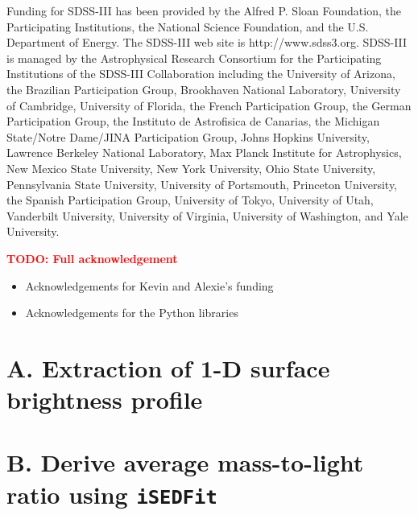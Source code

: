 \documentclass[preprint]{aastex}
\newcommand{\todo}[1]{\textcolor{red}{\textbf{TODO: #1}}}
\begin{document}
\begin{CJK*}{UTF8}{gbsn}
  Funding for SDSS-III has been provided by the Alfred P. Sloan Foundation, the
  Participating Institutions, the National Science Foundation, and the U.S.
  Department of Energy. The SDSS-III web site is http://www.sdss3.org.  SDSS-III
  is managed by the Astrophysical Research Consortium for the Participating
  Institutions of the SDSS-III Collaboration including the University of
  Arizona, the Brazilian Participation Group, Brookhaven National Laboratory,
  University of Cambridge, University of Florida, the French Participation
  Group, the German Participation Group, the Instituto de Astrofisica de
  Canarias, the Michigan State/Notre Dame/JINA Participation Group, Johns
  Hopkins University, Lawrence Berkeley National Laboratory, Max Planck
  Institute for Astrophysics, New Mexico State University, New York University,
  Ohio State University, Pennsylvania State University, University of
  Portsmouth, Princeton University, the Spanish Participation Group, University
  of Tokyo, University of Utah, Vanderbilt University, University of Virginia,
  University of Washington, and Yale University.
  
  \todo{Full acknowledgement}\\
  \begin{itemize}
      \item Acknowledgements for Kevin and Alexie's funding 
      \item Acknowledgements for the Python libraries
  \end{itemize}



    





\appendix

\section{A. Extraction of 1-D surface brightness profile} 

\section{B. Derive average mass-to-light ratio using \texttt{iSEDFit}} 


\end{CJK*}
\end{document}
